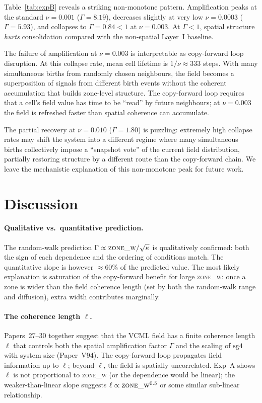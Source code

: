 \documentclass[11pt,a4paper]{article}
\begin{document}
Table~\ref{tab:expB} reveals a striking non-monotone pattern.  Amplification peaks at
the standard $\nu=0.001$ ($\Gamma=8.19$), decreases slightly at very low $\nu=0.0003$
($\Gamma=5.93$), and collapses to $\Gamma=0.84 < 1$ at $\nu=0.003$.
At $\Gamma < 1$, spatial structure \emph{hurts} consolidation compared with the
non-spatial Layer~I baseline.

The failure of amplification at $\nu=0.003$ is interpretable as copy-forward loop
disruption.  At this collapse rate, mean cell lifetime is $1/\nu \approx 333$ steps.
With many simultaneous births from randomly chosen neighbours, the field becomes a
superposition of signals from different birth events without the coherent accumulation
that builds zone-level structure.  The copy-forward loop requires that a cell's field
value has time to be ``read'' by future neighbours; at $\nu=0.003$ the field is refreshed
faster than spatial coherence can accumulate.

The partial recovery at $\nu=0.010$ ($\Gamma=1.80$) is puzzling: extremely high collapse
rates may shift the system into a different regime where many simultaneous births
collectively impose a ``snapshot vote'' of the current field distribution, partially
restoring structure by a different route than the copy-forward chain.  We leave the
mechanistic explanation of this non-monotone peak for future work.

\section{Discussion}
\label{sec:discussion}

\paragraph{Qualitative vs.\ quantitative prediction.}
The random-walk prediction $\Gamma \propto \textsc{zone\_w}/\sqrt{\kappa}$ is
qualitatively confirmed: both the sign of each dependence and the ordering of conditions
match.  The quantitative slope is however $\approx 60\%$ of the predicted value.
The most likely explanation is saturation of the copy-forward benefit for large
\textsc{zone\_w}: once a zone is wider than the field coherence length (set by both
the random-walk range and diffusion), extra width contributes marginally.

\paragraph{The coherence length $\ell$.}
Papers~27--30 together suggest that the VCML field has a finite coherence length
$\ell$ that controls both the spatial amplification factor $\Gamma$ and the scaling of
$\mathrm{sg4}$ with system size (Paper~V94).  The copy-forward loop propagates field
information up to $\ell$; beyond $\ell$, the field is spatially uncorrelated.
Exp~A shows $\ell$ is not proportional to \textsc{zone\_w} (or the dependence would be
linear); the weaker-than-linear slope suggests $\ell \propto \textsc{zone\_w}^{0.5}$
or some similar sub-linear relationship.
\end{document}
